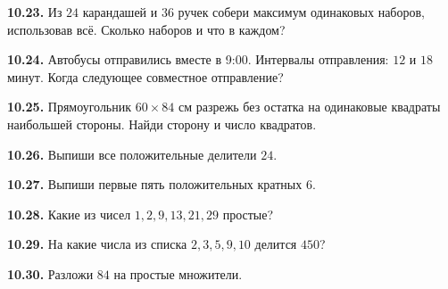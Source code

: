 \noindent\begin{minipage}[t]{\linewidth}\textbf{10.23.} Из \(24\) карандашей и \(36\) ручек собери максимум одинаковых наборов, использовав всё. Сколько наборов и что в каждом?\par\end{minipage}\par
\noindent\begin{minipage}[t]{\linewidth}\textbf{10.24.} Автобусы отправились вместе в 9:00. Интервалы отправления: \(12\) и \(18\) минут. Когда следующее совместное отправление?\par\end{minipage}\par
\noindent\begin{minipage}[t]{\linewidth}\textbf{10.25.} Прямоугольник \(60 \times  84\) см разрежь без остатка на одинаковые квадраты наибольшей стороны. Найди сторону и число квадратов.\par\end{minipage}\par
\noindent\begin{minipage}[t]{\linewidth}\textbf{10.26.} Выпиши все положительные делители \(24\).\par\end{minipage}\par
\noindent\begin{minipage}[t]{\linewidth}\textbf{10.27.} Выпиши первые пять положительных кратных \(6\).\par\end{minipage}\par
\noindent\begin{minipage}[t]{\linewidth}\textbf{10.28.} Какие из чисел \(1,\allowbreak 2,\allowbreak 9,\allowbreak 13,\allowbreak 21,\allowbreak 29\) простые?\par\end{minipage}\par
\noindent\begin{minipage}[t]{\linewidth}\textbf{10.29.} На какие числа из списка \(2,\allowbreak 3,\allowbreak 5,\allowbreak 9,\allowbreak 10\) делится \(450\)?\par\end{minipage}\par
\noindent\begin{minipage}[t]{\linewidth}\textbf{10.30.} Разложи \(84\) на простые множители.\par\end{minipage}\par
